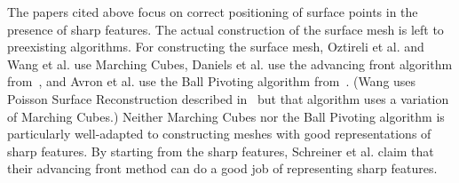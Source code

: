 The papers cited above focus on correct positioning of surface points
in the presence of sharp features.
The actual construction of the surface mesh is
left to preexisting algorithms.
For constructing the surface mesh,
Oztireli et al. and Wang et al. use Marching Cubes,
Daniels et al. use the advancing front algorithm 
from~\cite{Schreiner:2006:Direct},
and Avron et al. use the Ball Pivoting algorithm 
from~\cite{Bernardini:1999:Ball}.
(Wang uses Poisson Surface Reconstruction described 
in~\cite{Kazhdan:2006:Poisson} but that algorithm
uses a variation of Marching Cubes.)
Neither Marching Cubes nor the Ball Pivoting algorithm
is particularly well-adapted to constructing meshes 
with good representations of sharp features.
By starting from the sharp features,
Schreiner et al. claim that their advancing front method
can do a good job of representing sharp features.




